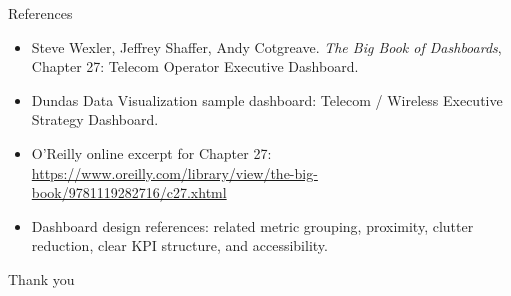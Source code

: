 \documentclass[aspectratio=169,10pt]{beamer}
\begin{document}
\begin{frame}{References}
\footnotesize
\begin{itemize}
  \item Steve Wexler, Jeffrey Shaffer, Andy Cotgreave. \textit{The Big Book of Dashboards}, Chapter 27: Telecom Operator Executive Dashboard.
  \item Dundas Data Visualization sample dashboard: Telecom / Wireless Executive Strategy Dashboard.
  \item O'Reilly online excerpt for Chapter 27: \url{https://www.oreilly.com/library/view/the-big-book/9781119282716/c27.xhtml}
  \item Dashboard design references: related metric grouping, proximity, clutter reduction, clear KPI structure, and accessibility.
\end{itemize}
\vfill
\begin{center}
\Large\textcolor{cttBlue}{Thank you}
\end{center}
\end{frame}
\end{document}
